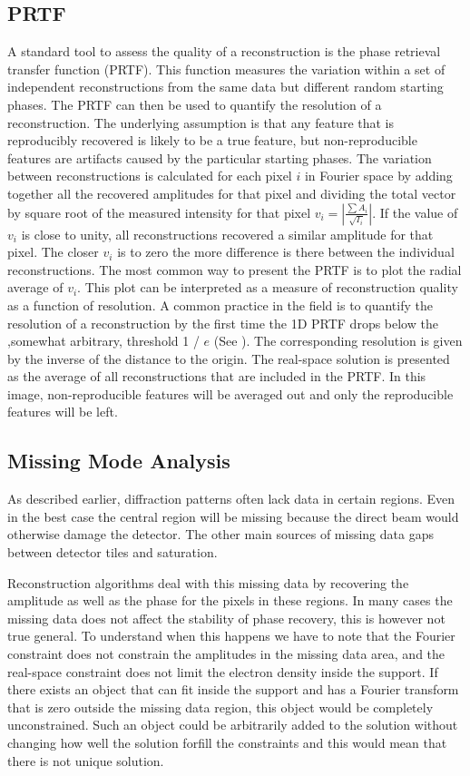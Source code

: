 \subsection{PRTF}
A standard tool to assess the quality of a reconstruction is the phase retrieval transfer function (PRTF). This function measures the variation within a set of independent reconstructions from the same data but different random starting phases. The PRTF can then be used to quantify the resolution of a reconstruction. The underlying assumption is that any feature that is reproducibly recovered is likely to be a true feature, but non-reproducible features are artifacts caused by the particular starting phases. The variation between reconstructions is calculated for each pixel $i$ in Fourier space by adding together all the recovered amplitudes for that pixel and dividing the total vector by square root of the measured intensity for that pixel $v_i = |\frac{\sum A_i}{\sqrt{I_i}}|$. If the value of $v_i$ is close to unity, all reconstructions recovered a similar amplitude for that pixel. The closer $v_i$ is to zero the more difference is there between the individual reconstructions. The most common way to present the PRTF is to plot the radial average of $v_i$. This plot can be interpreted as a measure of reconstruction quality as a function of resolution. A common practice in the field is to quantify the resolution of a reconstruction by the first time the 1D PRTF drops below the ,somewhat arbitrary, threshold 1 / $e$ (See \cite{Seibert2011}). The corresponding resolution is given by the inverse of the distance to the origin. The real-space solution is presented as the average of all reconstructions that are included in the PRTF. In this image, non-reproducible features will be averaged out and only the reproducible features will be left.
 
\subsection{Missing Mode Analysis}
As described earlier, diffraction patterns often lack data in certain regions. Even in the best case the central region will be missing because the direct beam would otherwise damage the detector. The other main sources of missing data gaps between detector tiles and saturation. 

Reconstruction algorithms deal with this missing data by recovering the amplitude as well as the phase for the pixels in these regions. In many cases the missing data does not affect the stability of phase recovery, this is however not true general. To understand when this happens we have to note that the Fourier constraint does not constrain the amplitudes in the missing data area, and the real-space constraint does not limit the electron density inside the support. If there exists an object that can fit inside the support and has a Fourier transform that is zero outside the missing data region, this object would be completely unconstrained. Such an object could be arbitrarily added to the solution without changing how well the solution forfill the constraints and this would mean that there is not unique solution.

